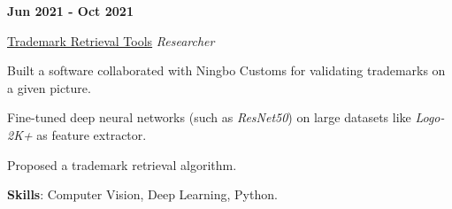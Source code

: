 \documentclass[9pt,a4paper]{article} %
\newenvironment{itemize-noindent}
{
\setlength{\leftmargini}{1em}
\begin{itemize}
\setlength{\itemsep}{0pt}
\setlength{\parskip}{0pt}
}
{\end{itemize}}
\begin{document}
\begin{multicols}{2}

\textbf{Jun 2021 - Oct 2021}

\href{https://github.com/Stx666Michael/logo_retrieval}{Trademark Retrieval Tools} \hfill \textit{Researcher}

\begin{itemize-noindent}
    \item Built a software collaborated with Ningbo Customs for validating trademarks on a given picture.
    \item Fine-tuned deep neural networks (such as \textit{ResNet50}) on large datasets like \textit{Logo-2K+} as feature extractor.
    \item Proposed a trademark retrieval algorithm.
    \item \textbf{Skills}: Computer Vision, Deep Learning, Python.
\end{itemize-noindent}

\end{multicols}
\end{document}
